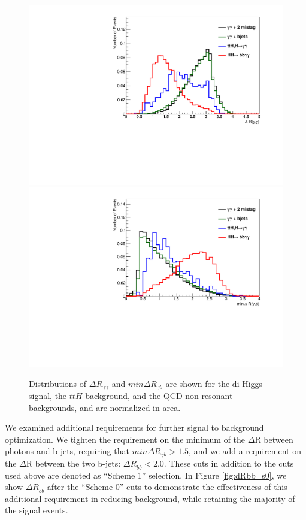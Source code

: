 \documentclass{cmspaper}
\begin{document}
\begin{figure}[h]
\centering
\includegraphics[scale=0.38, angle=0]{figures/dRgg_ps_normalized}	
\includegraphics[scale=0.38, angle=0]{figures/minDRgb_ps_normalized.pdf}	
\caption{Distributions of $\Delta R_{\gamma\gamma}$ and $min\Delta R_{\gamma b}$ are shown for the 
di-Higgs signal, the  $t\bar{t}H$ background, and the QCD non-resonant backgrounds, and are
normalized in area. }
\label{fig:scheme0}
\end{figure}

We examined additional requirements for further signal to background optimization. 
We tighten the requirement on the minimum of the $\Delta$R between photons and b-jets, 
requiring that  $min\Delta R_{\gamma b} > 1.5$, and we add a requirement on
the $\Delta$R between the two b-jets: $\Delta R_{b\bar{b}}<2.0$. These cuts in addition
to the cuts used above are denoted as ``Scheme 1'' selection. 
In Figure \ref{fig:dRbb_s0}, we show $\Delta R_{b\bar{b}}$ after the ``Scheme 0'' cuts 
to demonstrate the effectiveness of this additional requirement in reducing background, while
retaining the majority of the signal events. 
\end{document}
